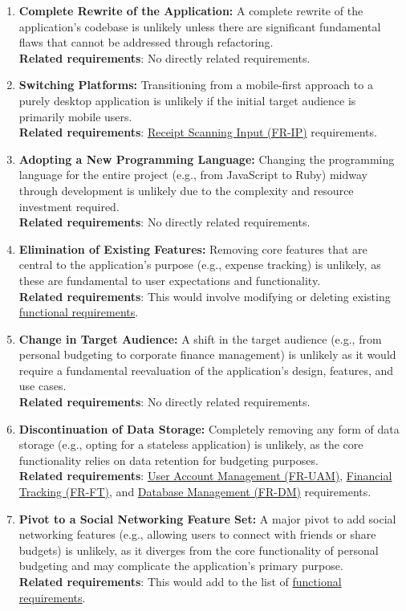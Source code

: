 \documentclass[12pt]{article}
\begin{document}
\begin{enumerate}[label=ULC\arabic*]
	\item \textbf{Complete Rewrite of the Application:} A complete rewrite of the
	application's codebase is unlikely unless there are significant fundamental
	flaws that cannot be addressed through refactoring.\\
  \textbf{Related requirements}: No directly related requirements.

	\item \textbf{Switching Platforms:} Transitioning from a mobile-first approach
	to a purely desktop application is unlikely if the initial target audience is
	primarily mobile users.\\
  \textbf{Related requirements}: \hyperref[FR-IP]{Receipt Scanning Input
  (FR-IP)} requirements.

	\item \textbf{Adopting a New Programming Language:} Changing the programming
	language for the entire project (e.g., from JavaScript to Ruby) midway through
	development is unlikely due to the complexity and resource investment
	required.\\
  \textbf{Related requirements}: No directly related requirements.

	\item \textbf{Elimination of Existing Features:} Removing core features that
	are central to the application's purpose (e.g., expense tracking) is unlikely,
	as these are fundamental to user expectations and functionality.\\
  \textbf{Related requirements}: This would involve modifying or deleting
  existing \hyperref[sec_funcReq]{functional requirements}.

	\item \textbf{Change in Target Audience:} A shift in the target audience
	(e.g., from personal budgeting to corporate finance management) is unlikely as
	it would require a fundamental reevaluation of the application's design,
	features, and use cases.\\
  \textbf{Related requirements}: No directly related requirements.

	\item \textbf{Discontinuation of Data Storage:} Completely removing any form
	of data storage (e.g., opting for a stateless application) is unlikely, as the
	core functionality relies on data retention for budgeting purposes.\\
  \textbf{Related requirements}: \hyperref[FR-UAM]{User Account Management
  (FR-UAM)}, \hyperref[FR-FT]{Financial Tracking (FR-FT)}, and
  \hyperref[FR-DM]{Database Management (FR-DM)} requirements.

	\item \textbf{Pivot to a Social Networking Feature Set:} A major pivot to add
	social networking features (e.g., allowing users to connect with friends or
	share budgets) is unlikely, as it diverges from the core functionality of
	personal budgeting and may complicate the application's primary purpose.\\
  \textbf{Related requirements}: This would add to the list of
  \hyperref[sec_funcReq]{functional requirements}.\end{enumerate}
\end{document}

